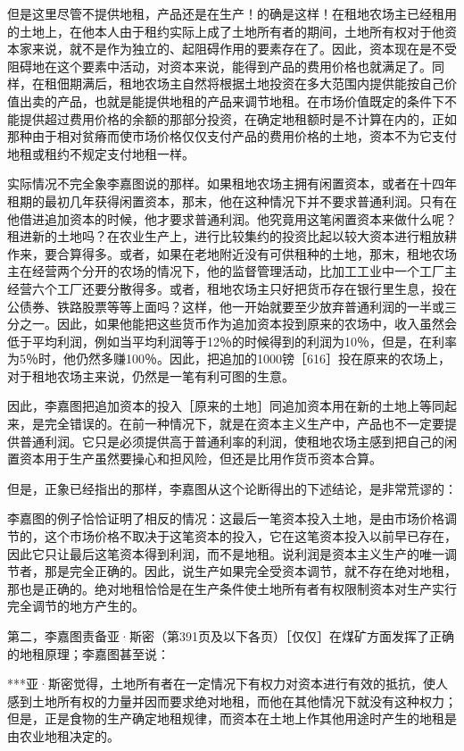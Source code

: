 但是这里尽管不提供地租，产品还是在生产！的确是这样！在租地农场主已经租用的土地上，在他本人由于租约实际上成了土地所有者的期间，土地所有权对于他资本家来说，就不是作为独立的、起阻碍作用的要素存在了。因此，资本现在是不受阻碍地在这个要素中活动，对资本来说，能得到产品的费用价格也就满足了。同样，在租佃期满后，租地农场主自然将根据土地投资在多大范围内提供能按自己价值出卖的产品，也就是能提供地租的产品来调节地租。在市场价值既定的条件下不能提供超过费用价格的余额的那部分投资，在确定地租额时是不计算在内的，正如那种由于相对贫瘠而使市场价格仅仅支付产品的费用价格的土地，资本不为它支付地租或租约不规定支付地租一样。

实际情况不完全象李嘉图说的那样。如果租地农场主拥有闲置资本，或者在十四年租期的最初几年获得闲置资本，那末，他在这种情况下并不要求普通利润。只有在他借进追加资本的时候，他才要求普通利润。他究竟用这笔闲置资本来做什么呢？租进新的土地吗？在农业生产上，进行比较集约的投资比起以较大资本进行粗放耕作来，要合算得多。或者，如果在老地附近没有可供租种的土地，那末，租地农场主在经营两个分开的农场的情况下，他的监督管理活动，比加工工业中一个工厂主经营六个工厂还要分散得多。或者，租地农场主只好把货币存在银行里生息，投在公债券、铁路股票等等上面吗？这样，他一开始就要至少放弃普通利润的一半或三分之一。因此，如果他能把这些货币作为追加资本投到原来的农场中，收入虽然会低于平均利润，例如当平均利润等于12％的时候得到的利润为10％，但是，在利率为5％时，他仍然多赚100％。因此，把追加的1000镑［616］投在原来的农场上，对于租地农场主来说，仍然是一笔有利可图的生意。

因此，李嘉图把追加资本的投入［原来的土地］同追加资本用在新的土地上等同起来，是完全错误的。在前一种情况下，就是在资本主义生产中，产品也不一定要提供普通利润。它只是必须提供高于普通利率的利润，使租地农场主感到把自己的闲置资本用于生产虽然要操心和担风险，但还是比用作货币资本合算。

但是，正象已经指出的那样，李嘉图从这个论断得出的下述结论，是非常荒谬的：



李嘉图的例子恰恰证明了相反的情况：这最后一笔资本投入土地，是由市场价格调节的，这个市场价格不取决于这笔资本的投入，它在这笔资本投入以前早已存在，因此它只让最后这笔资本得到利润，而不是地租。说利润是资本主义生产的唯一调节者，那是完全正确的。因此，说生产如果完全受资本调节，就不存在绝对地租，那也是正确的。绝对地租恰恰是在生产条件使土地所有者有权限制资本对生产实行完全调节的地方产生的。

第二，李嘉图责备亚·斯密（第391页及以下各页）［仅仅］在煤矿方面发挥了正确的地租原理；李嘉图甚至说：

***亚·斯密觉得，土地所有者在一定情况下有权力对资本进行有效的抵抗，使人感到土地所有权的力量并因而要求绝对地租，而他在其他情况下就没有这种权力；但是，正是食物的生产确定地租规律，而资本在土地上作其他用途时产生的地租是由农业地租决定的。

